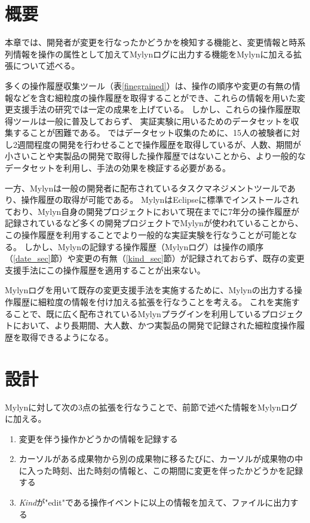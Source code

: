 \documentclass[a4paper]{jsbook}
\begin{document}
\section{概要}
本章では、開発者が変更を行なったかどうかを検知する機能と、変更情報と時系列情報を操作の属性として加えてMylynログに出力する機能をMylynに加える拡張について述べる。

多くの操作履歴収集ツール（表\ref{finegrained}）は、操作の順序や変更の有無の情報などを含む細粒度の操作履歴を取得することができ、これらの情報を用いた変更支援手法の研究では一定の成果を上げている。
しかし、これらの操作履歴取得ツールは一般に普及しておらず、
実証実験に用いるためのデータセットを収集することが困難である。
\cite{6233415,KatoJapanese:2011,ss2012-76,ss2013-84,Yamamori:2016}ではデータセット収集のために、15人の被験者に対し2週間程度の開発を行わせることで操作履歴を取得しているが、人数、期間が小さいことや実製品の開発で取得した操作履歴ではないことから、より一般的なデータセットを利用し、手法の効果を検証する必要がある。

一方、Mylyn\cite{Kersten:2005}は一般の開発者に配布されているタスクマネジメントツールであり、操作履歴の取得が可能である。
MylynはEclipseに標準でインストールされており、Mylyn自身の開発プロジェクトにおいて現在までに7年分の操作履歴が記録されているなど多くの開発プロジェクトでMylynが使われていることから、この操作履歴を利用することでより一般的な実証実験を行なうことが可能となる。
しかし、Mylynの記録する操作履歴（Mylynログ）は操作の順序（\ref{date_sec}節）や変更の有無（\ref{kind_sec}節）が記録されておらず、既存の変更支援手法にこの操作履歴を適用することが出来ない。

Mylynログを用いて既存の変更支援手法を実施するために、Mylynの出力する操作履歴に細粒度の情報を付け加える拡張を行なうことを考える。
これを実施することで、既に広く配布されているMylynプラグインを利用しているプロジェクトにおいて、より長期間、大人数、かつ実製品の開発で記録された細粒度操作履歴を取得できるようになる。

\section{設計}
Mylynに対して次の3点の拡張を行なうことで、前節で述べた情報をMylynログに加える。
\begin{enumerate}
  \item 変更を伴う操作かどうかの情報を記録する
  \item カーソルがある成果物から別の成果物に移るたびに、カーソルが成果物の中に入った時刻、出た時刻の情報と、この期間に変更を伴ったかどうかを記録する
  \item {\it Kind}が"edit"である操作イベントに以上の情報を加えて、ファイルに出力する
\end{enumerate}
\end{document}
